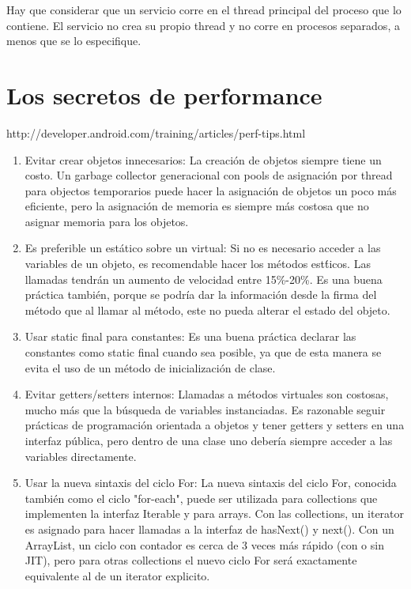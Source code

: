 Hay que considerar que un servicio corre en el thread principal del proceso que lo contiene. El servicio no crea su propio thread y no corre en procesos separados, a menos que se lo especifique.

\section{Los secretos de performance}
\label{sec:performance.secrets}

http://developer.android.com/training/articles/perf-tips.html

\begin{enumerate}

\item Evitar crear objetos innecesarios: La creaci\'on de objetos siempre tiene un costo. Un garbage collector generacional con pools de asignaci\'on por thread para objectos temporarios puede hacer la asignaci\'on de objetos un poco m\'as eficiente, pero la asignaci\'on de memoria es siempre m\'as costosa que no asignar memoria para los objetos.

\item Es preferible un est\'atico sobre un virtual: Si no es necesario acceder a las variables de un objeto, es recomendable hacer los m\'etodos est\'ticos. Las llamadas tendr\'an un aumento de velocidad entre 15\%-20\%. Es una buena pr\'actica tambi\'en, porque se podr\'ia dar la informaci\'on desde la firma del m\'etodo que al llamar al m\'etodo, este no pueda alterar el estado del objeto.

\item Usar static final para constantes: Es una buena pr\'actica declarar las constantes como static final cuando sea posible, ya que de esta manera se evita el uso de un m\'etodo de inicializaci\'on de clase. 

\item Evitar getters/setters internos: Llamadas a m\'etodos virtuales son costosas, mucho m\'as que la b\'usqueda de variables instanciadas. Es razonable seguir pr\'acticas de programaci\'on orientada a objetos y tener getters y setters en una interfaz p\'ublica, pero dentro de una clase uno deber\'ia siempre acceder a las variables directamente.

\item Usar la nueva sintaxis del ciclo For: La nueva sintaxis del ciclo For, conocida tambi\'en como el ciclo "for-each", puede ser utilizada para collections que implementen la interfaz Iterable y para arrays. Con las collections, un iterator es asignado para hacer llamadas a la interfaz de hasNext() y next(). Con un ArrayList, un ciclo con contador es cerca de 3 veces m\'as r\'apido (con o sin \ac{JIT}), pero para otras collections el nuevo ciclo For ser\'a exactamente equivalente al de un iterator explicito.


\end{enumerate}
